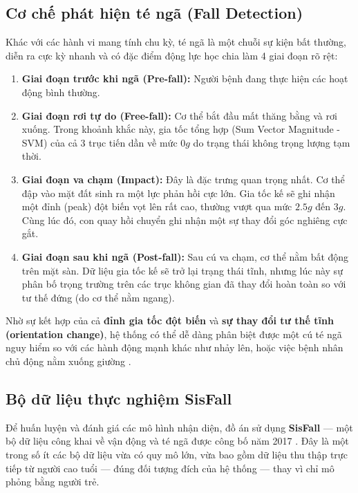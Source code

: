 \documentclass[../DoAn.tex]{subfiles}
\begin{document}
\subsection{Cơ chế phát hiện té ngã (Fall Detection)}
Khác với các hành vi mang tính chu kỳ, té ngã là một chuỗi sự kiện bất thường, diễn ra cực kỳ nhanh và có đặc điểm động lực học chia làm 4 giai đoạn rõ rệt:
\begin{enumerate}
    \item \textbf{Giai đoạn trước khi ngã (Pre-fall):} Người bệnh đang thực hiện các hoạt động bình thường.
    \item \textbf{Giai đoạn rơi tự do (Free-fall):} Cơ thể bắt đầu mất thăng bằng và rơi xuống. Trong khoảnh khắc này, gia tốc tổng hợp (Sum Vector Magnitude - SVM) của cả 3 trục tiến dần về mức $0g$ do trạng thái không trọng lượng tạm thời.
    \item \textbf{Giai đoạn va chạm (Impact):} Đây là đặc trưng quan trọng nhất. Cơ thể đập vào mặt đất sinh ra một lực phản hồi cực lớn. Gia tốc kế sẽ ghi nhận một đỉnh (peak) đột biến vọt lên rất cao, thường vượt qua mức $2.5g$ đến $3g$. Cùng lúc đó, con quay hồi chuyển ghi nhận một sự thay đổi góc nghiêng cực gắt.
    \item \textbf{Giai đoạn sau khi ngã (Post-fall):} Sau cú va chạm, cơ thể nằm bất động trên mặt sàn. Dữ liệu gia tốc kế sẽ trở lại trạng thái tĩnh, nhưng lúc này sự phân bố trọng trường trên các trục không gian đã thay đổi hoàn toàn so với tư thế đứng (do cơ thể nằm ngang).
\end{enumerate}

Nhờ sự kết hợp của cả \textbf{đỉnh gia tốc đột biến} và \textbf{sự thay đổi tư thế tĩnh (orientation change)}, hệ thống có thể dễ dàng phân biệt được một cú té ngã nguy hiểm so với các hành động mạnh khác như nhảy lên, hoặc việc bệnh nhân chủ động nằm xuống giường \cite{tseng2025wearable, lee2021deep}.

\subsection{Bộ dữ liệu thực nghiệm SisFall}
\label{subsection:3.1.3}
Để huấn luyện và đánh giá các mô hình nhận diện, đồ án sử dụng \textbf{SisFall} --- một bộ dữ liệu công khai về vận động và té ngã được công bố năm 2017 \cite{sucerquia2017sisfall}. Đây là một trong số ít các bộ dữ liệu vừa có quy mô lớn, vừa bao gồm dữ liệu thu thập trực tiếp từ người cao tuổi --- đúng đối tượng đích của hệ thống --- thay vì chỉ mô phỏng bằng người trẻ.
\end{document}
